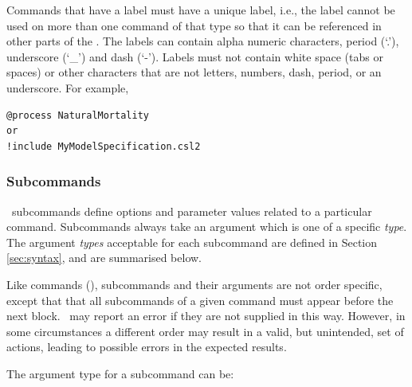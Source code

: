 Commands that have a label must have a unique label, i.e., the label cannot be used on more than one command of that type so that it can be referenced in other parts of the \config. The labels can contain alpha numeric characters, period (`.'), underscore (`\_') and dash (`-'). Labels must not contain white space (tabs or spaces) or other characters that are not letters, numbers, dash, period, or an underscore. For example,

{\small{\begin{verbatim}
@process NaturalMortality
or
!include MyModelSpecification.csl2
\end{verbatim}}}

\subsubsection{Subcommands}

\CNAME\ subcommands define options and parameter values related to a particular command. Subcommands always take an argument which is one of a specific \emph{type}. The argument \emph{types} acceptable for each subcommand are defined in Section \ref{sec:syntax}, and are summarised below.

Like commands (), subcommands and their arguments are not order specific, except that that all subcommands of a given command must appear before the next  block. \CNAME\ may report an error if they are not supplied in this way. However, in some circumstances a different order may result in a valid, but unintended, set of actions, leading to possible errors in the expected results.

The argument type for a subcommand can be:

